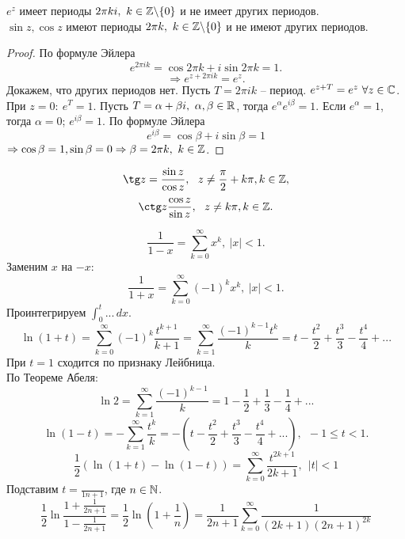 \begin{Thm}[Т8]
    $e^z$ имеет периоды $2 \pi ki, \ k \in \mathbb{Z} \backslash \{ 0 \} $ и не имеет других периодов.\\
    $\sin z, \cos z$ имеют периоды $2\pi k, \ k \in \mathbb{Z} \backslash \{ 0\}$ и не имеют других периодов.
\end{Thm}

\begin{proof}
    По формуле Эйлера $$e^{2 \pi ik} = \cos 2\pi k + i \sin 2 \pi k = 1.$$
    $$\Rightarrow e^{z + 2 \pi ik} = e^z.$$
    Докажем, что других периодов нет. Пусть $T = 2\pi ik$ -- период.
    $e^{z + T} = e^z \ \forall z \in \mathbb{C}$. При $z = 0: \ e^T = 1$. Пусть $T = \alpha + \beta i, \ \alpha, \beta \in \mathbb{R}$, тогда 
    $e^{\alpha}e^{i\beta} = 1$. Если $e^{\alpha} = 1$, тогда $\alpha = 0$; $e^{i\beta} = 1$. По формуле Эйлера 
    \[ e^{i \beta} = \cos \beta + i \sin \beta = 1\]
    $\Rightarrow \cos \beta = 1, \sin \beta = 0 \Rightarrow \beta = 2 \pi k, \ k \in \mathbb{Z}$. 
\end{proof}

\begin{Cons}
    $$ \tg z = \frac{\sin z}{\cos z}, \ \ z \neq \frac{\pi}{2} + k \pi, k \in \Z,$$
    $$ \ctg z \frac{\cos z}{\sin z}, \ \ z \neq k \pi, k \in \Z.$$
\end{Cons}  


\begin{Rem}
    \[ \frac{1}{1 - x} = \sum_{k = 0}^{\infty} x^k, \ |x| < 1.\]
    Заменим $x$ на $-x$:
    \[ \frac{1}{1 + x} = \sum_{k = 0}^{\infty} (-1)^k x^k, \ |x| < 1.\]
    Проинтегрируем $\displaystyle \int_{0}^{t} ... \,dx$.
    \[ \ln (1 + t) = \sum_{k = 0}^{\infty} (-1)^k \frac{t^{k+1}}{k + 1} = \sum_{k = 1}^{\infty} \frac{(-1)^{k - 1}t^k}{k} = t - \frac{t^2}{2} + \frac{t^3}{3} - \frac{t^4}{4} + ... \]
    При $t = 1$ сходится по признаку Лейбница. \\
    По Теореме Абеля:
    \[ \ln 2 = \sum_{k = 1}^{\infty} \frac{(-1)^{ k - 1}}{k} = 1 - \frac{1}{2} + \frac{1}{3} - \frac{1}{4} + ... \]
    \[ \ln (1 - t) = - \sum_{k = 1}^{\infty} \frac{t^k}{k} = - (t - \frac{t^2}{2} + \frac{t^3}{3} - \frac{t^4}{4} + ...), \ \ -1 \leqslant t < 1. \]
    \[ \frac{1}{2}(\ln (1 + t) - \ln (1 - t)) = \sum_{k = 0}^{\infty} \frac{t^{2k + 1}}{2k + 1}, \ \ |t|< 1 \]
    Подставим $\displaystyle t = \frac{}{1n + 1}$, где $n \in \mathbb{N}$. 
    \[ \frac{1}{2} \ln \frac{1 + \frac{1}{2n + 1}}{1 - \frac{1}{2n + 1}} = \frac{1}{2} \ln (1 + \frac{1}{n}) = \frac{1}{2n + 1} \sum_{k = 0}^{\infty} \frac{1}{(2k + 1)(2n + 1)^{2k}}\] 
\end{Rem}

